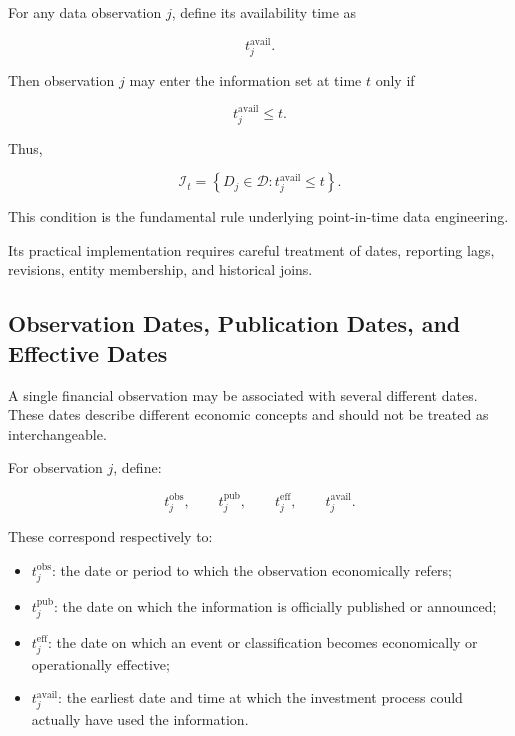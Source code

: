 \documentclass[11pt,a4paper]{article}
\begin{document}
For any data observation $j$, define its availability time as

\begin{equation}
t_j^{\mathrm{avail}}.
\end{equation}

Then observation $j$ may enter the information set at time $t$ only if

\begin{equation}
\boxed{
t_j^{\mathrm{avail}}
\leq
t.
}
\end{equation}

Thus,

\begin{equation}
\boxed{
\mathcal{I}_t
=
\left\{
D_j\in\mathcal{D}
:
t_j^{\mathrm{avail}}
\leq t
\right\}.
}
\end{equation}

This condition is the fundamental rule underlying point-in-time data
engineering.

Its practical implementation requires careful treatment of dates, reporting
lags, revisions, entity membership, and historical joins.


\subsection{Observation Dates, Publication Dates, and Effective Dates}
\label{subsec:pit_dates}

A single financial observation may be associated with several different dates.
These dates describe different economic concepts and should not be treated as
interchangeable.

For observation $j$, define:

\begin{equation}
t_j^{\mathrm{obs}},
\qquad
t_j^{\mathrm{pub}},
\qquad
t_j^{\mathrm{eff}},
\qquad
t_j^{\mathrm{avail}}.
\end{equation}

These correspond respectively to:

\begin{itemize}
    \item $t_j^{\mathrm{obs}}$: the date or period to which the observation
    economically refers;

    \item $t_j^{\mathrm{pub}}$: the date on which the information is officially
    published or announced;

    \item $t_j^{\mathrm{eff}}$: the date on which an event or classification
    becomes economically or operationally effective;

    \item $t_j^{\mathrm{avail}}$: the earliest date and time at which the
    investment process could actually have used the information.
\end{itemize}
\end{document}
